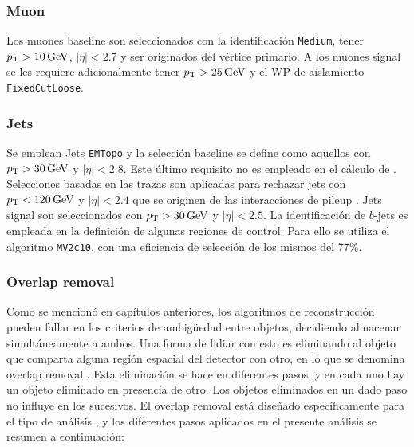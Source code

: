 \subsubsection{Muon}

Los muones baseline son seleccionados con la identificación \texttt{Medium}, tener $p_{\text{T}}>10\,\text{GeV}$, $|\eta|<2.7$ y ser originados del vértice primario. A los muones signal se les requiere adicionalmente tener $p_{\text{T}}>25\,\text{GeV}$ y el WP de aislamiento \texttt{FixedCutLoose}.


\subsubsection{Jets}

Se emplean Jets \texttt{EMTopo} y la selección baseline se define como aquellos con $p_{\text{T}}>30\,\text{GeV}$ y $|\eta|<2.8$. Este último requisito no es empleado en el cálculo de \met. Selecciones basadas en las trazas son aplicadas para rechazar jets con $p_{\text{T}}<120\,\text{GeV}$ y $|\eta|<2.4$ que se originen de las interacciones de pileup \cite{ATL-PHYS-PUB-2014-001}. Jets signal son seleccionados con $p_{\text{T}}>30\,\text{GeV}$ y $|\eta|<2.5$. La identificación de $b$-jets es empleada en la definición de algunas regiones de control. Para ello se utiliza el algoritmo \texttt{MV2c10}, con una eficiencia de selección de los mismos del 77\%.

\subsubsection{Overlap removal}

Como se mencionó en capítulos anteriores, los algoritmos de reconstrucción pueden fallar en los criterios de ambigüedad entre objetos, decidiendo almacenar simultáneamente a ambos. Una forma de lidiar con esto es eliminando al objeto que comparta alguna región espacial del detector con otro, en lo que se denomina overlap removal \cite{Adams:1743654}. Esta eliminación se hace en diferentes pasos, y en cada uno hay un objeto eliminado en presencia de otro. Los objetos eliminados en un dado paso no influye en los sucesivos.
El overlap removal está diseñado específicamente para el tipo de análisis \cite{ATL-COM-PHYS-2016-1518}, y los diferentes pasos aplicados en el presente análisis se resumen a continuación: 

